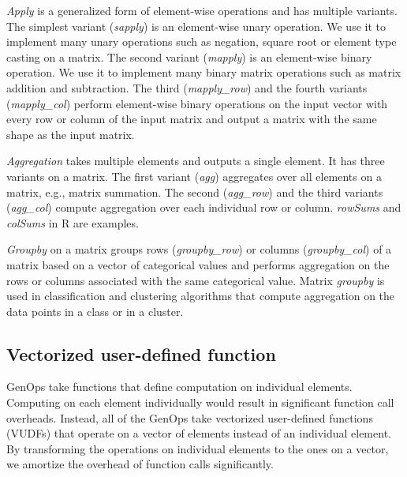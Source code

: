 \textit{Apply} is a generalized form of element-wise operations and has
multiple variants. The simplest variant (\textit{sapply}) is
an element-wise unary operation. We use it to implement many unary
operations such as negation, square root or element type casting
on a matrix. The second variant (\textit{mapply}) is an
element-wise binary operation. We use it to implement many binary
matrix operations such as matrix addition and subtraction. The third
(\textit{mapply\_row}) and the fourth variants (\textit{mapply\_col}) perform element-wise
binary operations on the input vector with every row or column of the input
matrix and output a matrix with the same shape as the input matrix.

\textit{Aggregation} takes multiple elements and outputs a single element.
It has three variants on a matrix. The first variant (\textit{agg})
aggregates over all elements on a matrix, e.g., matrix summation. The second
(\textit{agg\_row}) and the third variants (\textit{agg\_col})
compute aggregation over each individual row or column. \textit{rowSums}
and \textit{colSums} in R are examples.

\textit{Groupby} on a matrix groups rows (\textit{groupby\_row}) or columns
(\textit{groupby\_col}) of a matrix based on a vector of categorical values
and performs aggregation on the rows or
columns associated with the same categorical value. Matrix \textit{groupby}
is used in classification and clustering algorithms that compute
aggregation on the data points in a class or in a cluster.

\subsection{Vectorized user-defined function} \label{sec:vudf}
GenOps take functions that define computation on individual elements.
Computing on each element individually would
result in significant function call overheads. Instead, all of
the GenOps take vectorized user-defined functions (VUDFs) that operate on
a vector of elements instead of an individual element. By transforming
the operations on individual elements to the ones on a vector, we amortize
the overhead of function calls significantly.

